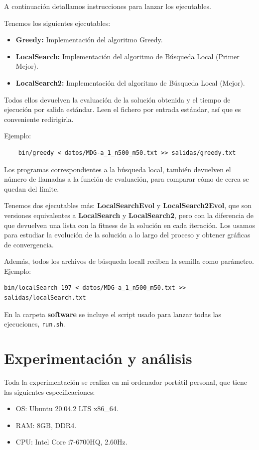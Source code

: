 \documentclass{article}
\begin{document}
A continuación detallamos instrucciones para lanzar los ejecutables.

Tenemos los siguientes ejecutables:

\begin{itemize}
	\item \textbf{Greedy:} Implementación del algoritmo Greedy.
	\item \textbf{LocalSearch:} Implementación del algoritmo de Búsqueda Local (Primer Mejor).
	\item \textbf{LocalSearch2:} Implementación del algoritmo de Búsqueda Local (Mejor).
\end{itemize}

Todos ellos devuelven la evaluación de la solución obtenida y el tiempo de ejecución por salida estándar.
Leen el fichero por entrada estándar, así que es conveniente redirigirla.

Ejemplo:
\begin{verbatim}
	bin/greedy < datos/MDG-a_1_n500_m50.txt >> salidas/greedy.txt
\end{verbatim}

Los programas correspondientes a la búsqueda local, también devuelven el número de llamadas a la función de evaluación, para
comparar cómo de cerca se quedan del límite.

Tenemos dos ejecutables más: \textbf{LocalSearchEvol} y \textbf{LocalSearch2Evol}, que son versiones equivalentes a
\textbf{LocalSearch} y \textbf{LocalSearch2}, pero con la diferencia de que devuelven una lista con la fitness de la solución
en cada iteración. Los usamos para estudiar la evolución de la solución a lo largo del proceso y obtener gráficas de convergencia.

Además, todos los archivos de búsqueda locall reciben la semilla como parámetro. Ejemplo:
\begin{verbatim}
bin/localSearch 197 < datos/MDG-a_1_n500_m50.txt >> salidas/localSearch.txt
\end{verbatim}

En la carpeta \textbf{software} se incluye el script usado para lanzar todas las ejecuciones, \texttt{run.sh}.

\pagebreak

\section{Experimentación y análisis}

Toda la experimentación se realiza en mi ordenador portátil personal, que tiene las siguientes especificaciones:
\begin{itemize}
	\item OS: Ubuntu 20.04.2 LTS x86\_64.
	\item RAM: 8GB, DDR4.
	\item CPU: Intel Core i7-6700HQ, 2.60Hz.
\end{itemize}
\end{document}
